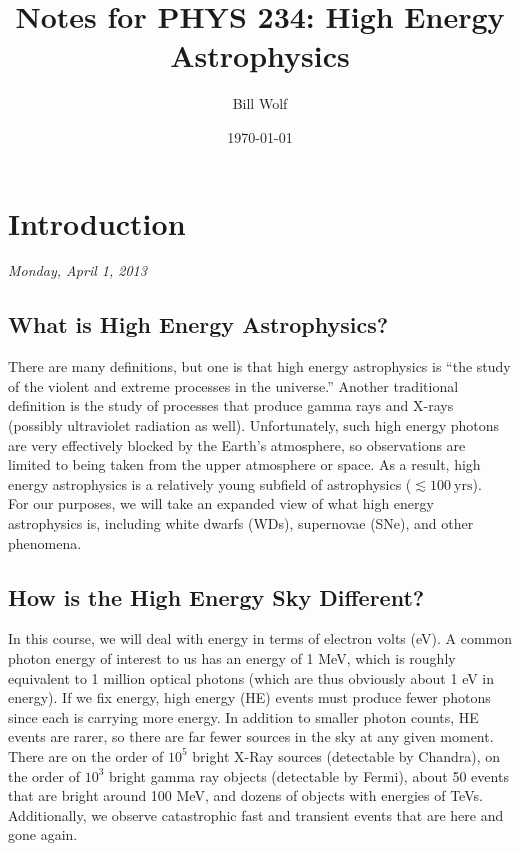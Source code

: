 \documentclass[10pt]{article}
\title{Notes for PHYS 234: High Energy Astrophysics}
\author{Bill Wolf}
\date{\today}
\numberwithin{equation}{section}
\newcommand{\n}{\noindent}
\begin{document}
\vfill\maketitle\vfill \newpage

\tableofcontents \newpage


\section{Introduction} %
\label{sec:introduction}
	\emph{Monday, April 1, 2013}\\
	\subsection{What is High Energy Astrophysics?} %
	\label{sub:what_is_high_energy_astrophysics_}
	There are many definitions, but one is that high energy astrophysics is ``the study of the violent and extreme processes in the universe.'' Another traditional definition is the study of processes that produce gamma rays and X-rays (possibly ultraviolet radiation as well). Unfortunately, such high energy photons are very effectively blocked by the Earth's atmosphere, so observations are limited to being taken from the upper atmosphere or space. As a result, high energy astrophysics is a relatively young subfield of astrophysics ($\lesssim 100\ \mathrm{yrs}$).\\
	
	\n For our purposes, we will take an expanded view of what high energy astrophysics is, including white dwarfs (WDs), supernovae (SNe), and other phenomena.
	\subsection{How is the High Energy Sky Different?} %
	\label{sub:how_is_the_high_energy_sky_different_}
	In this course, we will deal with energy in terms of electron volts (eV). A common photon energy of interest to us has an energy of 1 MeV, which is roughly equivalent to 1 million optical photons (which are thus obviously about 1 eV in energy). If we fix energy, high energy (HE) events must produce fewer photons since each is carrying more energy. In addition to smaller photon counts, HE events are rarer, so there are far fewer sources in the sky at any given moment. There are on the order of $10^5$ bright X-Ray sources (detectable by Chandra), on the order of $10^3$ bright gamma ray objects (detectable by Fermi), about 50 events that are bright around 100 MeV, and dozens of objects with energies of TeVs. Additionally, we observe catastrophic fast and transient events that are here and gone again.
	
\end{document}

